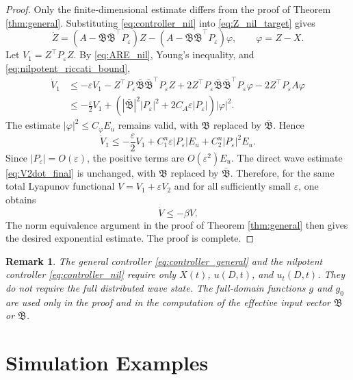 \documentclass[journal]{IEEEtran}
\newtheorem{remark}{Remark}
\newcommand{\eps}{\varepsilon}
\newcommand{\Bcal}{\mathfrak B}
\newcommand{\Bbar}{\bar{\mathfrak B}}
\newcommand{\abs}[1]{\left|#1\right|}
\begin{document}
\begin{proof}
Only the finite-dimensional estimate differs from the proof of Theorem \ref{thm:general}. Substituting \eqref{eq:controller_nil} into \eqref{eq:Z_nil_target} gives
\begin{equation}
 \dot Z=(A-\Bbar\Bbar^\top P_\eps)Z-(A-\Bbar\Bbar^\top P_\eps)\varphi,
 \qquad \varphi=Z-X.
\label{eq:Z_nil_closed}
\end{equation}
Let $V_1=Z^\top P_\eps Z$. By \eqref{eq:ARE_nil}, Young's inequality, and \eqref{eq:nilpotent_riccati_bound},
\begin{align}
 \dot V_1
&\le -\eps V_1-Z^\top P_\eps\Bbar\Bbar^\top P_\eps Z
 +2Z^\top P_\eps\Bbar\Bbar^\top P_\eps\varphi
 -2Z^\top P_\eps A\varphi\nonumber\\
&\le -\frac{\eps}{2}V_1
 +\left(\abs{\Bbar}^2\abs{P_\eps}^2+2C_A\eps\abs{P_\eps}\right)\abs{\varphi}^2.\label{eq:nil_V1}
\end{align}
The estimate $\abs{\varphi}^2\le C_\varphi E_u$ remains valid, with $\Bcal$ replaced by $\Bbar$. Hence
\begin{equation}
 \dot V_1\le -\frac{\eps}{2}V_1+C_1^n\eps\abs{P_\eps}E_u+C_2^n\abs{P_\eps}^2E_u.
\end{equation}
Since $\abs{P_\eps}=O(\eps)$, the positive terms are $O(\eps^2)E_u$. The direct wave estimate \eqref{eq:V2dot_final} is unchanged, with $\Bcal$ replaced by $\Bbar$. Therefore, for the same total Lyapunov functional $V=V_1+\eps V_2$ and for all sufficiently small $\eps$, one obtains
\begin{equation}
 \dot V\le -\beta V.
\end{equation}
The norm equivalence argument in the proof of Theorem \ref{thm:general} then gives the desired exponential estimate. The proof is complete.
\end{proof}

\begin{remark}
The general controller \eqref{eq:controller_general} and the nilpotent controller \eqref{eq:controller_nil} require only $X(t)$, $u(D,t)$, and $u_t(D,t)$. They do not require the full distributed wave state. The full-domain functions $g$ and $g_0$ are used only in the proof and in the computation of the effective input vector $\Bcal$ or $\Bbar$.
\end{remark}

\section{Simulation Examples}
\end{document}
